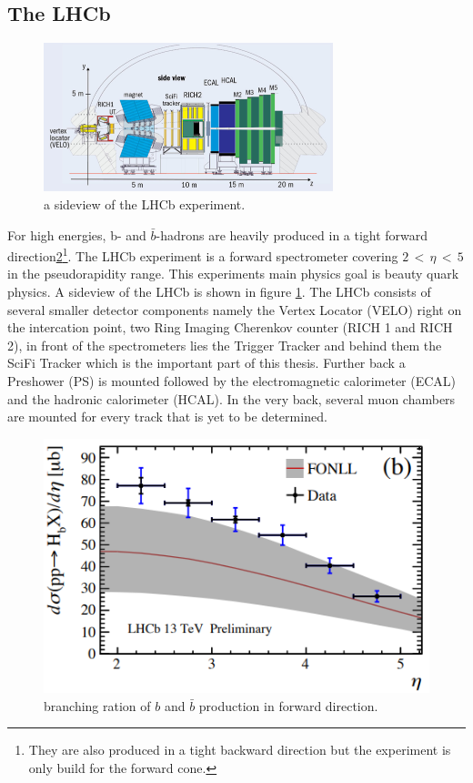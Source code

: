 \subsection{The LHCb}

\begin{figure}
  \centering
  \includegraphics[width=0.75\textwidth]{plots/LHCb_facility.jpg}
  \caption{a sideview of the LHCb experiment\cite{facilityLHCb}.}
  \label{fig:LHCb}
\end{figure}

For high energies, b- and $\bar{b}$-hadrons are heavily produced in a tight forward
direction\ref{fig:bbforward}\footnote{They are also produced in a tight backward
direction but the experiment is only build for the forward cone.}.
The LHCb experiment\cite{lhcbInfo} is a forward spectrometer covering
$2 \,<\, \eta \,<\, 5$ in the pseudorapidity range. This experiments main
physics goal is beauty quark physics. A sideview of
the LHCb is shown in figure \ref{fig:LHCb}.
The LHCb consists of several smaller detector components namely the Vertex Locator
(VELO) right on the intercation point, two Ring Imaging Cherenkov counter
(RICH 1 and RICH 2), in front of the spectrometers lies the Trigger Tracker and
behind them the SciFi Tracker which is the important part of this thesis. Further
back a Preshower (PS) is mounted followed
by the electromagnetic calorimeter (ECAL) and the hadronic calorimeter (HCAL).
In the very back, several muon chambers are mounted for every track that is yet
to be determined.


\begin{figure}
  \centering
  \includegraphics{plots/bbar_forward.png}
  \caption{branching ration of $b$ and $\bar{b}$ production in forward direction\cite{forward}\cite{fonll}.}
  \label{fig:bbforward}
\end{figure}

